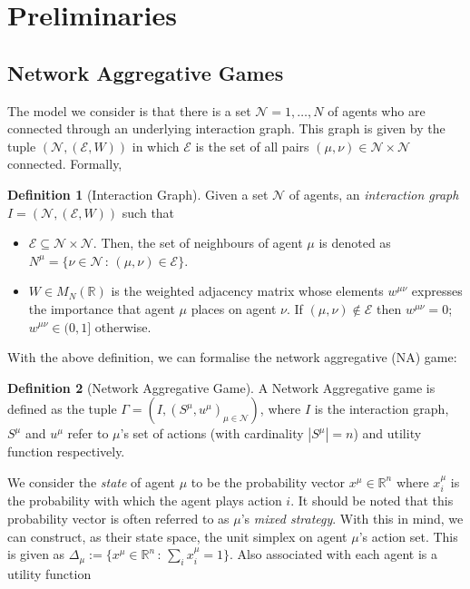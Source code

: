 \documentclass{article}
\theoremstyle{definition}
\newtheorem{definition}{Definition}
\newcommand{\agentset}{\mathcal{N}}
\newcommand{\edgeset}{\mathcal{E}}
\newcommand{\weightset}{W}
\newcommand{\actionset}[1]{S^{#1}}
\newcommand{\utility}[1]{u^{#1}}
\newcommand{\wmunu}{w^{\mu \nu}}
\newcommand{\xmu}{x^{\mu}}
\newcommand{\xmuaction}[1]{x^{\mu}_{#1}}
\begin{document}
\section{Preliminaries}
\subsection{Network Aggregative Games}
\label{sec::NAG}

  The model we consider is that there is a set $\agentset = {1,
           \ldots , N}$ of agents who are connected through an underlying
          interaction graph. This graph is given by the tuple
          $(\agentset, (\edgeset, \weightset))$ in which $\edgeset$ is
          the set of all pairs $(\mu, \nu) \in \agentset \times \agentset$
          connected. Formally,
        
  \begin{definition}[Interaction Graph]
    Given a set $\agentset$ of agents, an {\em interaction graph} $I = (\agentset, (\edgeset,
    \weightset))$ such that
    \begin{itemize}
    \item $\edgeset \subseteq \agentset \times \agentset$.        Then, the set of neighbours of agent
        $\mu$ is denoted as $N^\mu = \{\nu \in \agentset \, : \, (\mu, \nu) \in \edgeset\}$.
      \item $\weightset \in M_N(\mathbb{R})$ is the weighted adjacency matrix whose elements $w^{\mu
        \nu}$ expresses the importance that agent $\mu$ places on agent $\nu$. If $(\mu, \nu) \not
        \in \edgeset$ then $w^{\mu \nu} = 0$;        $\wmunu \in (0, 1]$ otherwise.
    \end{itemize}
  \end{definition}

  With the above definition, we can formalise the network aggregative (NA) game:

  \begin{definition}[Network Aggregative Game]
    A Network Aggregative game is defined as the tuple $\Gamma = (I, (\actionset{\mu},
        \utility{\mu})_{\mu \in \mathcal{N}})$, where $I$ is the interaction graph,
        $\actionset{\mu}$ and $\utility{\mu}$ refer to $\mu$'s set of actions (with cardinality
        $|\actionset{\mu}| = n$) and utility function respectively.
  \end{definition}

  We consider the \emph{state} of agent $\mu$ to be the probability vector $\xmu \in
  \mathbb{R}^n$ where $\xmu_i$ is the probability with which the agent plays action $i$. It
  should be noted that this probability vector is often referred to as $\mu$'s \emph{mixed
  strategy}. With this in mind, we can construct, as their state space, the unit simplex on
  agent $\mu$'s action set. This is given as $\Delta_\mu := \{\xmu \in \mathbb{R}^n \, : \,
  \sum_i \xmuaction{i} = 1\}$. Also associated with each agent is a utility function
\end{document}
